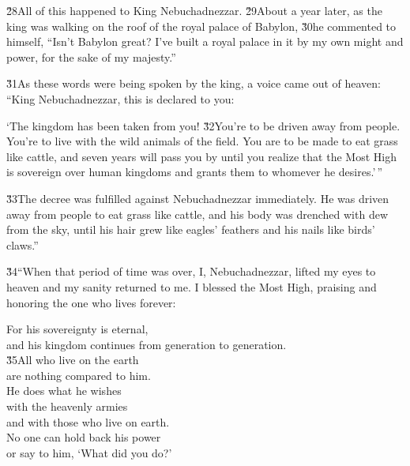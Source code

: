 \v{28}All of this happened to King Nebuchadnezzar. \v{29}About a year later, as the king was walking on the roof of the royal palace of Babylon, \v{30}he commented to himself, ``Isn't Babylon great? I've built a royal palace in it by my own might and power, for the sake of my majesty.''

\v{31}As these words were being spoken by the king, a voice came out of heaven: ``King Nebuchadnezzar, this is declared to you:

\begin{poetry}
\poeml `The kingdom has been taken from you! \v{32}You're to be driven away from people. You're to live with the wild animals of the field. You are to be made to eat grass like cattle, and seven years will pass you by until you realize that the Most High is sovereign over human kingdoms and grants them to whomever he desires.'\,''
\end{poetry}

\v{33}The decree was fulfilled against Nebuchadnezzar immediately. He was driven away from people to eat grass like cattle, and his body was drenched with dew from the sky, until his hair grew like eagles' feathers and his nails like birds' claws.''

\v{34}``When that period of time was over, I, Nebuchadnezzar, lifted my eyes to heaven and my sanity returned to me. I blessed the Most High, praising and honoring the one who lives forever:

\begin{poetry}
\poeml For his sovereignty is eternal, \\
\poemll    and his kingdom continues from generation to generation. \\
\poeml \v{35}All who live on the earth \\
\poemll    are nothing compared to him. \\
\poeml He does what he wishes \\
\poemll    with the heavenly armies \\
\poemlll       and with those who live on earth. \\
\poeml No one can hold back his power \\
\poemll    or say to him, `What did you do?'
\end{poetry}

